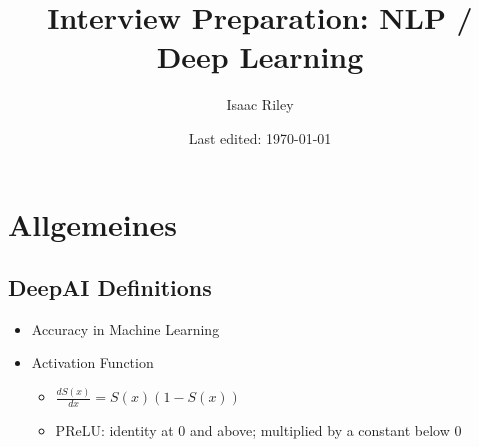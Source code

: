 \documentclass[a4paper]{article}
\title{Interview Preparation: NLP / Deep Learning}
\author{Isaac Riley}
\date{Last edited: \today}
\newcommand{\cmark}{\ding{51}}%
\newcommand{\done}{\rlap{$\square$}{\raisebox{2pt}{\large\hspace{1pt}\cmark}}\hspace{-2.5pt}}
\begin{document}
\maketitle
\tableofcontents
\newpage



\setcounter{section}{-1}
\section{Allgemeines}

\subsection{DeepAI Definitions}
\begin{itemize}
    \item [\done] Accuracy in Machine Learning
    \item [\done] Activation Function \\
    \begin{itemize}
        \item $\frac{dS(x)}{dx} = S(x)(1-S(x))$
        \item PReLU: identity at 0 and above; multiplied by a constant below 0
    \end{itemize}


\end{itemize}
\end{document}
